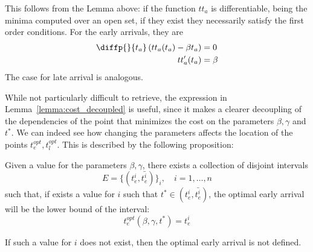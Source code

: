 This follows from the Lemma above:
if the function \(tt_a\) is differentiable, being the minima computed over an open set,
if they exist they necessarily satisfy the first order conditions.
For the early arrivals, they are
\begin{align*}
  \diffp{}{{t_a}} \left(tt_a(t_a) - \beta t_a\right) & = 0 \\
  tt_a'(t_a) & = \beta
\end{align*}
The case for late arrival is analogous.

While not particularly difficult to retrieve,
the expression in Lemma~\ref{lemma:cost_decoupled} is useful,
since it makes a clearer decoupling of the dependencies of the point that minimizes the cost on the parameters \(\beta, \gamma\) and \(t^*\).
We can indeed see how changing the parameters affects the location of the points \(t_e^{opt}, t_l^{opt}\).
This is described by the following proposition:
\begin{prop}
  Given a value for the parameters \(\beta, \gamma\),
  there exists a collection of disjoint intervals
  \begin{equation*}
    E = \{(t_e^i, \bar{t_e^i})\}_i,\quad i = 1, \dots, n
  \end{equation*}
  such that, if exists a value for \(i\) such that \(t^* \in (t_e^i, \bar{t_e^i})\),
  the optimal early arrival will be the lower bound of the interval:
  \begin{equation*}
    t_e^{opt}(\beta, \gamma, t^*) = t_e^{i}
  \end{equation*}

  If such a value for \(i\) does not exist,
  then the optimal early arrival is not defined.
\end{prop}

